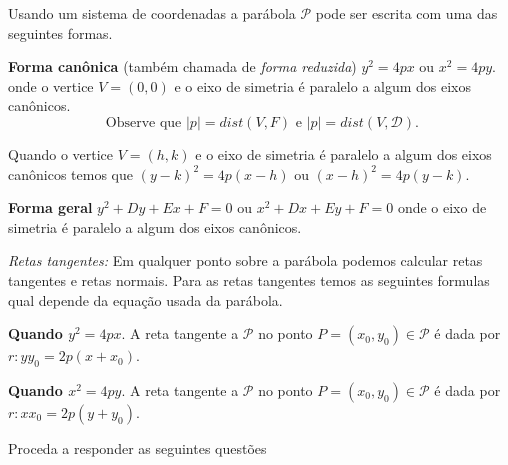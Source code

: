 \documentclass{article}
\begin{document}
 
 Usando um sistema de coordenadas a parábola $\mathcal{P}$ pode ser escrita com uma das 
 seguintes formas. 
 
 {\bf Forma canônica }(também chamada de {\it forma reduzida}) $y^{2}=4px$ ou $x^2=4py$.
 onde o vertice $V=(0,0)$ e o eixo de simetria é paralelo a algum dos eixos canônicos.
 $$ \text{ Observe que } |p|=dist(V,F) \text{ e } 
                         |p|=dist(V,\mathcal{D}). $$
 
 Quando o vertice $V=(h,k)$ e o eixo de simetria é paralelo a algum dos eixos canônicos temos que $(y-k)^{2}=4p(x-h)$ ou $(x-h)^2=4p(y-k)$.
 
 {\bf Forma geral} $y^{2}+Dy+Ex+F=0$ ou $x^{2}+Dx+Ey+F=0$
 onde o eixo de simetria é paralelo a algum dos eixos canônicos.
 
 
 {\it Retas tangentes: } 
 Em qualquer ponto sobre a parábola podemos 
 calcular retas tangentes e retas normais.
 Para as retas tangentes temos as seguintes formulas qual depende da 
 equação usada da parábola.
 
 {\bf Quando $y^{2}=4px$}. A reta tangente a $\mathcal{P}$ no ponto $P=(x_0,y_0) \in \mathcal{P}$ é dada por 
 $ r: yy_0=2p(x+x_0)$. 
 
 {\bf Quando $x^{2}=4py$}. A reta tangente a $\mathcal{P}$ no ponto $P=(x_0,y_0) \in \mathcal{P}$ é dada por 
 $ r: xx_0=2p(y+y_0)$. \newline

 
Proceda a responder as seguintes questões 
  
\end{document}
